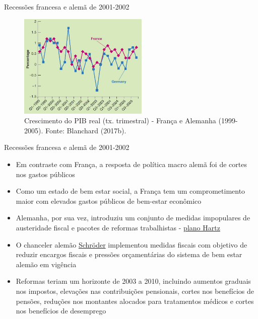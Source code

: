 \documentclass[10pt]{beamer}
\begin{document}
\begin{frame}{Recessões francesa e alemã de 2001-2002}
    \begin{figure}
        \centering
        \includegraphics[width=0.55\textwidth]{./figures/aula082_fig8.JPG}
        \caption{Crescimento do PIB real (tx. trimestral) - França e Alemanha (1999-2005). Fonte: Blanchard (2017b).}
        \label{fig2}
    \end{figure}
\end{frame}

\begin{frame}{Recessões francesa e alemã de 2001-2002}
\begin{itemize}
    \item Em contraste com França, a resposta de política macro alemã foi de cortes nos gastos públicos
    \bigskip
    \item Como um estado de bem estar social, a França tem um comprometimento maior com elevados gastos públicos de bem-estar econômico
    \bigskip
    \item Alemanha, por sua vez, introduziu um conjunto de medidas impopulares de austeridade fiscal e pacotes de reformas trabalhistas - \href{https://en.wikipedia.org/wiki/Hartz_concept}{plano Hartz}
    \bigskip
    \item O chanceler alemão \href{https://en.wikipedia.org/wiki/Gerhard_Schr\%C3\%B6der}{Schröder} implementou medidas fiscais com objetivo de reduzir encargos fiscais e pressões orçamentárias do sistema de bem estar alemão em vigência
    \bigskip
    \item Reformas teriam um horizonte de 2003 a 2010, incluindo aumentos graduais nos impostos, elevações nas contribuições pensionais, cortes nos benefícios de pensões, reduções nos montantes alocados para tratamentos médicos e cortes nos benefícios de desemprego
\end{itemize}
\end{frame}
\end{document}
